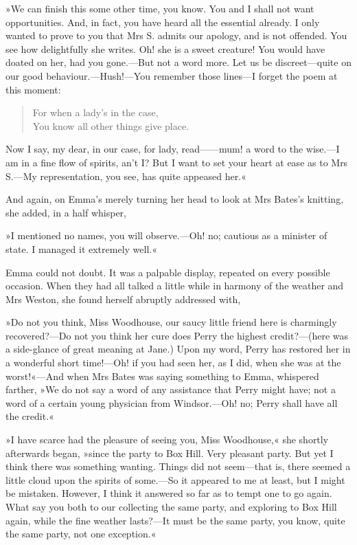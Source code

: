 »We can finish this some other time, you know. You and I shall not want opportunities. And, in fact, you have heard all the essential already. I only wanted to prove to you that Mrs S. admits our apology, and is not offended. You see how delightfully she writes. Oh! she is a sweet creature! You would have doated on her, had you gone.—But not a word more. Let us be discreet—quite on our good behaviour.—Hush!—You remember those lines—I forget the poem at this moment:

\begin{verse}
For when a lady's in the case,\\
You know all other things give place.
\end{verse}


Now I say, my dear, in our case, for lady, read——mum! a word to the wise.—I am in a fine flow of spirits, an't I? But I want to set your heart at ease as to Mrs S.—My representation, you see, has quite appeased her.«

And again, on Emma's merely turning her head to look at Mrs Bates's knitting, she added, in a half whisper,

»I mentioned no names, you will observe.—Oh! no; cautious as a minister of state. I managed it extremely well.«

Emma could not doubt. It was a palpable display, repeated on every possible occasion. When they had all talked a little while in harmony of the weather and Mrs Weston, she found herself abruptly addressed with,

»Do not you think, Miss Woodhouse, our saucy little friend here is charmingly recovered?—Do not you think her cure does Perry the highest credit?—(here was a side-glance of great meaning at Jane.) Upon my word, Perry has restored her in a wonderful short time!—Oh! if you had seen her, as I did, when she was at the worst!«—And when Mrs Bates was saying something to Emma, whispered farther, »We do not say a word of any assistance that Perry might have; not a word of a certain young physician from Windsor.—Oh! no; Perry shall have all the credit.«

»I have scarce had the pleasure of seeing you, Miss Woodhouse,« she shortly afterwards began, »since the party to Box Hill. Very pleasant party. But yet I think there was something wanting. Things did not seem—that is, there seemed a little cloud upon the spirits of some.—So it appeared to me at least, but I might be mistaken. However, I think it answered so far as to tempt one to go again. What say you both to our collecting the same party, and exploring to Box Hill again, while the fine weather lasts?—It must be the same party, you know, quite the same party, not one exception.«

